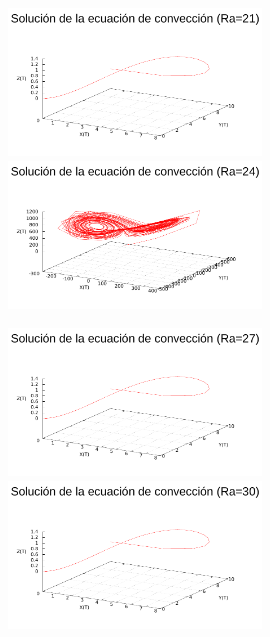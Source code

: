 \begin{figure} [H]
\hspace{-1cm} \includegraphics[width=0.6\textwidth]{./parte4/graficos/grafico_P3_3d_ra21.pdf}\includegraphics[width=0.6\textwidth]{./parte4/graficos/grafico_P3_3d_ra24.pdf}
\caption{} 
\end{figure}

\begin{figure} [H]
\hspace{-1cm} \includegraphics[width=0.6\textwidth]{./parte4/graficos/grafico_P3_3d_ra27.pdf}\includegraphics[width=0.6\textwidth]{./parte4/graficos/grafico_P3_3d_ra30.pdf}
\caption{} 
\end{figure}